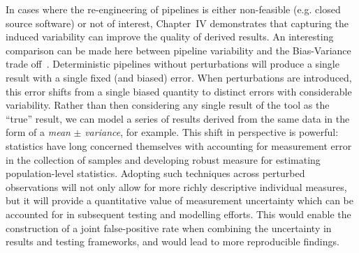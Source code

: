 In cases where the re-engineering of pipelines is either non-feasible (e.g. closed source software) or not of
interest, Chapter~IV demonstrates that capturing the induced variability can improve the quality of derived results.
An interesting comparison can be made here between pipeline variability and the Bias-Variance trade
off~\cite{jain2000statistical}. Deterministic pipelines without perturbations will produce a single result with a
single fixed (and biased) error. When perturbations are introduced, this error shifts from a single biased quantity
to distinct errors with considerable variability. Rather than then considering any single result of the tool as the
``true'' result, we can model a series of results derived from the same data in the form of a \textit{mean} $\pm$
\textit{variance}, for example. This shift in perspective is powerful: statistics have long concerned themselves
with accounting for measurement error in the collection of samples and developing robust measure for estimating
population-level statistics. Adopting such techniques across perturbed observations will not only allow for more
richly descriptive individual measures, but it will provide a quantitative value of measurement uncertainty which
can be accounted for in subsequent testing and modelling efforts. This would enable the construction of a joint
false-positive rate when combining the uncertainty in results and testing frameworks, and would lead to more
reproducible findings.

